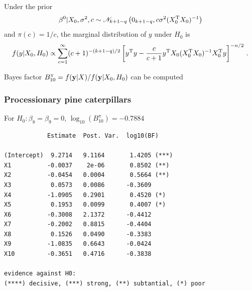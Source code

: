 \begin{slide}
\end{slide}\begin{slide}

Under the prior 
$$
\beta^0|X_0,\sigma^2,c\sim\mathscr{N}_{k+1-q}\left(0_{k+1-q},c\sigma^2(X_0^{\mathrm{T}} X_0)^{-1}\right)
$$
and $\pi(c)=1/c$, the marginal distribution of $y$ under $H_0$ is
\small
$$
f(y|X_0,H_0)\propto \sum_{c=1}^\infty (c+1)^{-(k+1-q)/2}\left[y^{\mathrm{T}} y-\frac{c}{c+1}
	y^{\mathrm{T}} X_0(X_0^{\mathrm{T}} X_0)^{-1}X_0^{\mathrm{T}} y\right]^{-n/2}\,.
$$

\pause
Bayes factor $B^\pi_{10}=f(\mathbf{y}|X)/f(\mathbf{y}|X_0,H_0)$ can be computed

\end{slide}\begin{frame}[fragile]
\frametitle{Processionary pine caterpillars}

For $H_0:\beta_8=\beta_9=0$, $\log_{10}(B^\pi_{10})=-0.7884$

\pause\small
\begin{verbatim}
            Estimate  Post. Var.  log10(BF)

(Intercept)  9.2714   9.1164       1.4205 (***)
X1          -0.0037    2e-06       0.8502 (**)
X2          -0.0454   0.0004       0.5664 (**)
X3           0.0573   0.0086      -0.3609
X4          -1.0905   0.2901       0.4520 (*)
X5           0.1953   0.0099       0.4007 (*)
X6          -0.3008   2.1372      -0.4412
X7          -0.2002   0.8815      -0.4404
X8           0.1526   0.0490      -0.3383
X9          -1.0835   0.6643      -0.0424
X10         -0.3651   0.4716      -0.3838

evidence against H0: 
(****) decisive, (***) strong, (**) subtantial, (*) poor
\end{verbatim}\normalsize

\end{frame}
